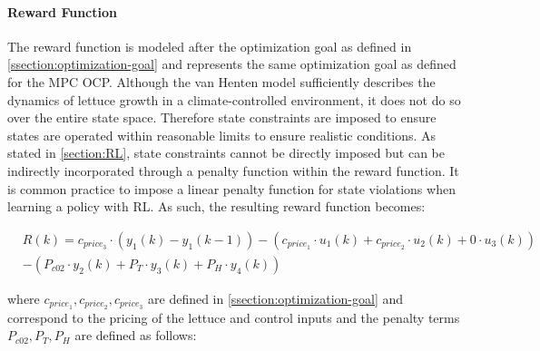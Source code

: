 \paragraph{Reward Function}
\label{paragraph:reward-function}
The reward function is modeled after the optimization goal as defined in \autoref{ssection:optimization-goal} and represents the same optimization goal as defined for the MPC OCP. Although the van Henten model sufficiently describes the dynamics of lettuce growth in a climate-controlled environment, it does not do so over the entire state space. Therefore state constraints are imposed to ensure states are operated within reasonable limits to ensure realistic conditions. As stated in \autoref{section:RL}, state constraints cannot be directly imposed but can be indirectly incorporated through a penalty function within the reward function. It is common practice to impose a linear penalty function for state violations when learning a policy with RL. As such, the resulting reward function becomes:

\begin{equation}\label{eq:reward_fn}
    \begin{aligned}
        & R(k)  = c_{price_3} \cdot (y_1(k)- y_1(k-1)) - (c_{price_1} \cdot u_1(k) + c_{price_2} \cdot u_2(k) + 0 \cdot u_3(k))  \\ 
        & - (P_{c02} \cdot y_2(k) + P_T \cdot y_3(k) + P_H \cdot y_4(k))
    \end{aligned}
\end{equation}

where $c_{price_1},c_{price_2},c_{price_3}$ are defined in \autoref{ssection:optimization-goal} and correspond to the pricing of the lettuce and control inputs
and the penalty terms $P_{c02},P_T,P_H$ are defined as follows:

